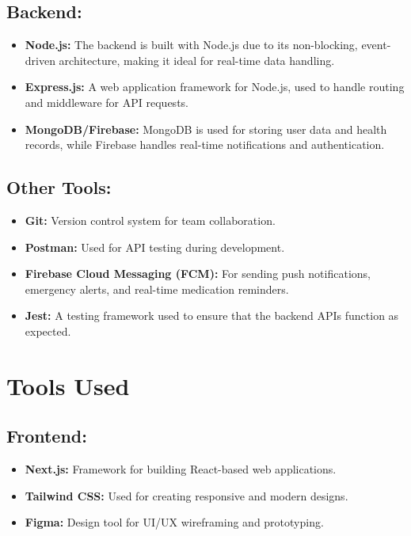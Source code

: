 \documentclass[a4paper, 12pt]{article} %
\begin{document}
\subsection*{Backend:}
\begin{itemize}
    \item \textbf{Node.js:} The backend is built with Node.js due to its non-blocking, event-driven architecture, making it ideal for real-time data handling.
    \item \textbf{Express.js:} A web application framework for Node.js, used to handle routing and middleware for API requests.
    \item \textbf{MongoDB/Firebase:} MongoDB is used for storing user data and health records, while Firebase handles real-time notifications and authentication.
\end{itemize}

\subsection*{Other Tools:}
\begin{itemize}
    \item \textbf{Git:} Version control system for team collaboration.
    \item \textbf{Postman:} Used for API testing during development.
    \item \textbf{Firebase Cloud Messaging (FCM):} For sending push notifications, emergency alerts, and real-time medication reminders.
    \item \textbf{Jest:} A testing framework used to ensure that the backend APIs function as expected.
\end{itemize}

\section{\textbf{\LARGE Tools Used}}

\subsection*{Frontend:}
\begin{itemize}
    \item \textbf{Next.js:} Framework for building React-based web applications.
    \item \textbf{Tailwind CSS:} Used for creating responsive and modern designs.
    \item \textbf{Figma:} Design tool for UI/UX wireframing and prototyping.
\end{itemize}
\end{document}
